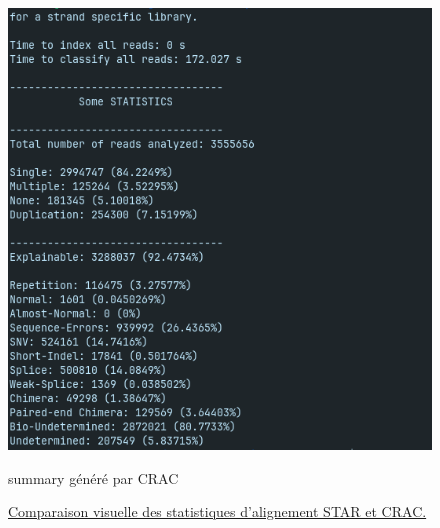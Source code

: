 \begin{figure}[H]
\begin{minipage}[b]{0.48\textwidth}
    \includegraphics[width=\linewidth]{CRAC_summary.png}
    \caption*{summary généré par CRAC}
  \end{minipage}
  \caption{\underline{Comparaison visuelle des statistiques d’alignement STAR et CRAC.}}
  \label{fig:annexe_star_crac}	
\end{figure}
\newpage
